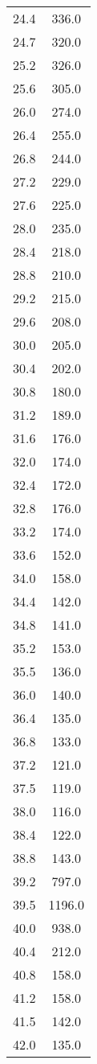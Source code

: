\begin{table}[h]
\begin{tabular}{S S}
    24.4 & 336.0\\
    24.7 & 320.0\\
    25.2 & 326.0\\
    25.6 & 305.0\\
    26.0 & 274.0\\
    26.4 & 255.0\\
    26.8 & 244.0\\
    27.2 & 229.0\\
    27.6 & 225.0\\
    28.0 & 235.0\\
    28.4 & 218.0\\
    28.8 & 210.0\\
    29.2 & 215.0\\
    29.6 & 208.0\\
    30.0 & 205.0\\
    30.4 & 202.0\\
    30.8 & 180.0\\
    31.2 & 189.0\\
    31.6 & 176.0\\
    32.0 & 174.0\\
    32.4 & 172.0\\
    32.8 & 176.0\\
    33.2 & 174.0\\
    33.6 & 152.0\\
    34.0 & 158.0\\
    34.4 & 142.0\\
    34.8 & 141.0\\
    35.2 & 153.0\\
    35.5 & 136.0\\
    36.0 & 140.0\\
    36.4 & 135.0\\
    36.8 & 133.0\\
    37.2 & 121.0\\
    37.5 & 119.0\\
    38.0 & 116.0\\
    38.4 & 122.0\\
    38.8 & 143.0\\
    39.2 & 797.0\\
    39.5 & 1196.0\\
    40.0 & 938.0\\
    40.4 & 212.0\\
    40.8 & 158.0\\
    41.2 & 158.0\\
    41.5 & 142.0\\
    42.0 & 135.0\\

\end{tabular}
\end{table}
